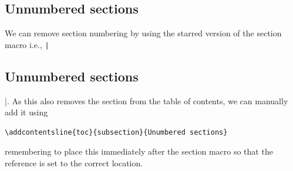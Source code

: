 \documentclass[11pt, twoside]{article}
\begin{document}
\subsection*{Unnumbered sections}
We can remove section numbering by using the starred version of the
section macro i.e., \linebreak \texttt|\subsection*{Unnumbered sections}|.
As this also removes the section from the table of contents, we can
manually add it using
\begin{verbatim}
\addcontentsline{toc}{subsection}{Unumbered sections}
\end{verbatim}
remembering to place this immediately after the section macro so that
the reference is set to the correct location.
\end{document}

